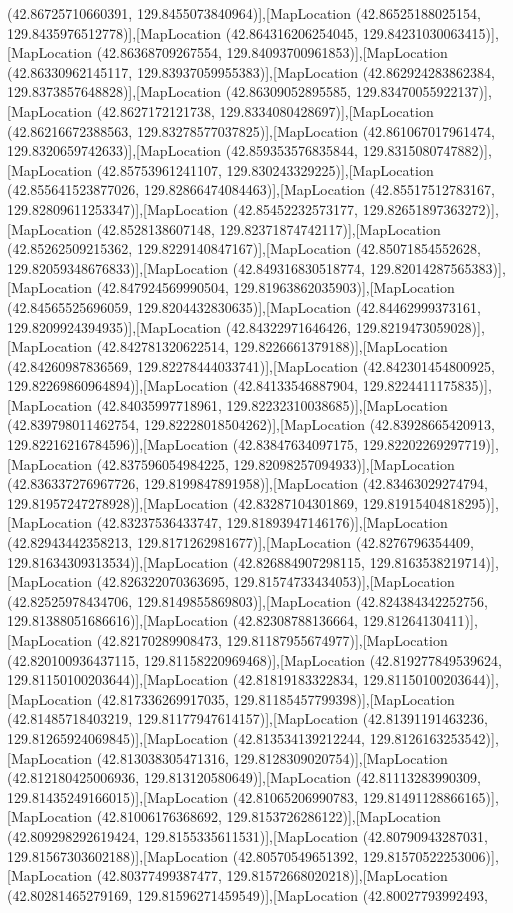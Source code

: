 (42.86725710660391, 129.8455073840964)],[MapLocation (42.86525188025154, 129.8435976512778)],[MapLocation (42.864316206254045, 129.84231030063415)],[MapLocation (42.86368709267554, 129.84093700961853)],[MapLocation (42.86330962145117, 129.83937059955383)],[MapLocation (42.862924283862384, 129.8373857648828)],[MapLocation (42.86309052895585, 129.83470055922137)],[MapLocation (42.8627172121738, 129.8334080428697)],[MapLocation (42.86216672388563, 129.83278577037825)],[MapLocation (42.861067017961474, 129.8320659742633)],[MapLocation (42.859353576835844, 129.8315080747882)],[MapLocation (42.85753961241107, 129.830243329225)],[MapLocation (42.855641523877026, 129.82866474084463)],[MapLocation (42.85517512783167, 129.82809611253347)],[MapLocation (42.85452232573177, 129.82651897363272)],[MapLocation (42.8528138607148, 129.82371874742117)],[MapLocation (42.85262509215362, 129.8229140847167)],[MapLocation (42.85071854552628, 129.82059348676833)],[MapLocation (42.849316830518774, 129.82014287565383)],[MapLocation (42.847924569990504, 129.81963862035903)],[MapLocation (42.84565525696059, 129.8204432830635)],[MapLocation (42.84462999373161, 129.8209924394935)],[MapLocation (42.84322971646426, 129.8219473059028)],[MapLocation (42.842781320622514, 129.8226661379188)],[MapLocation (42.84260987836569, 129.82278444033741)],[MapLocation (42.842301454800925, 129.82269860964894)],[MapLocation (42.84133546887904, 129.8224411175835)],[MapLocation (42.84035997718961, 129.82232310038685)],[MapLocation (42.839798011462754, 129.82228018504262)],[MapLocation (42.83928665420913, 129.82216216784596)],[MapLocation (42.83847634097175, 129.82202269297719)],[MapLocation (42.837596054984225, 129.82098257094933)],[MapLocation (42.836337276967726, 129.8199847891958)],[MapLocation (42.83463029274794, 129.81957247278928)],[MapLocation (42.83287104301869, 129.81915404818295)],[MapLocation (42.83237536433747, 129.81893947146176)],[MapLocation (42.82943442358213, 129.8171262981677)],[MapLocation (42.8276796354409, 129.81634309313534)],[MapLocation (42.826884907298115, 129.8163538219714)],[MapLocation (42.826322070363695, 129.81574733434053)],[MapLocation (42.82525978434706, 129.8149855869803)],[MapLocation (42.824384342252756, 129.81388051686616)],[MapLocation (42.82308788136664, 129.81264130411)],[MapLocation (42.82170289908473, 129.81187955674977)],[MapLocation (42.820100936437115, 129.81158220969468)],[MapLocation (42.819277849539624, 129.81150100203644)],[MapLocation (42.81819183322834, 129.81150100203644)],[MapLocation (42.817336269917035, 129.81185457799398)],[MapLocation (42.81485718403219, 129.81177947614157)],[MapLocation (42.81391191463236, 129.81265924069845)],[MapLocation (42.813534139212244, 129.8126163253542)],[MapLocation (42.813038305471316, 129.8128309020754)],[MapLocation (42.812180425006936, 129.813120580649)],[MapLocation (42.81113283990309, 129.81435249166015)],[MapLocation (42.81065206990783, 129.81491128866165)],[MapLocation (42.81006176368692, 129.8153726286122)],[MapLocation (42.809298292619424, 129.8155335611531)],[MapLocation (42.80790943287031, 129.81567303602188)],[MapLocation (42.80570549651392, 129.81570522253006)],[MapLocation (42.80377499387477, 129.81572668020218)],[MapLocation (42.80281465279169, 129.81596271459549)],[MapLocation (42.80027793992493, 